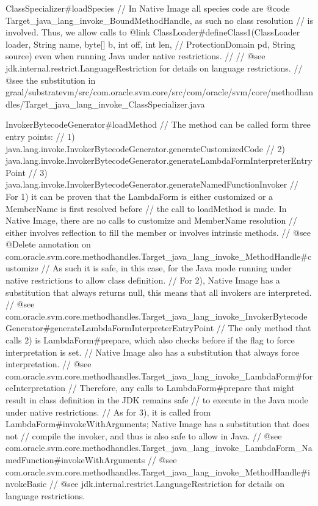 ClassSpecializer#loadSpecies
// In Native Image all species code are {@code Target_java_lang_invoke_BoundMethodHandle}, as such no class resolution
// is involved. Thus, we allow calls to {@link ClassLoader#defineClass1(ClassLoader loader, String name, byte[] b, int off, int len,
// ProtectionDomain pd, String source)} even when running Java under native restrictions.
//
// @see jdk.internal.restrict.LanguageRestriction for details on language restrictions.
// @see the substitution in graal/substratevm/src/com.oracle.svm.core/src/com/oracle/svm/core/methodhandles/Target_java_lang_invoke_ClassSpecializer.java

InvokerBytecodeGenerator#loadMethod
// The method can be called form three entry points:
//    1) java.lang.invoke.InvokerBytecodeGenerator.generateCustomizedCode
//    2) java.lang.invoke.InvokerBytecodeGenerator.generateLambdaFormInterpreterEntryPoint
//    3) java.lang.invoke.InvokerBytecodeGenerator.generateNamedFunctionInvoker
// For 1) it can be proven that the LambdaForm is either customized or a MemberName is first resolved before
// the call to loadMethod is made. In Native Image, there are no calls to customize and MemberName resolution
// either involves reflection to fill the member or involves intrinsic methods.
// @see @Delete annotation on com.oracle.svm.core.methodhandles.Target_java_lang_invoke_MethodHandle#customize
// As such it is safe, in this case, for the Java mode running under native restrictions to allow class definition.
// For 2), Native Image has a substitution that always returns null, this means that all invokers are interpreted.
// @see com.oracle.svm.core.methodhandles.Target_java_lang_invoke_InvokerBytecodeGenerator#generateLambdaFormInterpreterEntryPoint
// The only method that calls 2) is LambdaForm#prepare, which also checks before if the flag to force interpretation is set.
// Native Image also has a substitution that always force interpretation.
// @see com.oracle.svm.core.methodhandles.Target_java_lang_invoke_LambdaForm#forceInterpretation
// Therefore, any calls to LambdaForm#prepare that might result in class definition in the JDK remains safe
// to execute in the Java mode under native restrictions.
// As for 3), it is called from LambdaForm#invokeWithArguments; Native Image has a substitution that does not
// compile the invoker, and thus is also safe to allow in Java.
// @see com.oracle.svm.core.methodhandles.Target_java_lang_invoke_LambdaForm_NamedFunction#invokeWithArguments
// @see com.oracle.svm.core.methodhandles.Target_java_lang_invoke_MethodHandle#invokeBasic
// @see jdk.internal.restrict.LanguageRestriction for details on language restrictions. 

